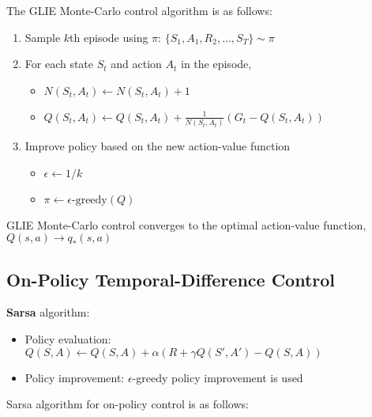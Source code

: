 \noindent The GLIE Monte-Carlo control algorithm is as follows:

\begin{enumerate}
    \item Sample $k$th episode using $\pi$: $\{S_1, A_1, R_2, \dots, S_T\} \sim \pi$
    \item For each state $S_t$ and action $A_t$ in the episode,
          \begin{itemize}
              \item $N(S_t, A_t) \leftarrow N(S_t, A_t) + 1$
              \item $Q(S_t, A_t) \leftarrow Q(S_t, A_t) + \frac{1}{N(S_t, A_t)} (G_t - Q(S_t, A_t))$
          \end{itemize}
    \item Improve policy based on the new action-value function
          \begin{itemize}
              \item $\epsilon \leftarrow 1/k$
              \item $\pi \leftarrow \epsilon\text{-greedy}(Q)$
          \end{itemize}
\end{enumerate}

\noindent GLIE Monte-Carlo control converges to the optimal action-value function, $Q(s,
    a) \rightarrow q_*(s, a)$

\subsection{On-Policy Temporal-Difference Control}

\textbf{Sarsa} algorithm:

\begin{itemize}
    \item Policy evaluation: $Q(S, A) \leftarrow Q(S, A) + \alpha (R + \gamma Q(S', A') -
              Q(S, A))$
    \item Policy improvement: $\epsilon$-greedy policy improvement is used
\end{itemize}

\noindent Sarsa algorithm for on-policy control is as follows:

